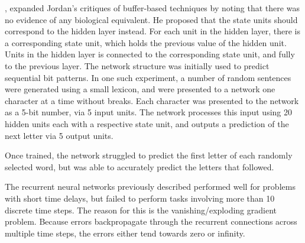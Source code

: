 


\cite{Elman:1990:Finding}, expanded Jordan's critiques of buffer-based
techniques by noting that there was no evidence of any biological equivalent.
He proposed that the state units should correspond to the hidden layer instead.
For each unit in the hidden layer, there is a corresponding state unit, which
holds the previous value of the hidden unit.
Units in the hidden layer is connected to the corresponding state unit, and
fully to the previous layer.
The network structure was initially used to predict sequential bit patterns.
In one such experiment, a number of random sentences were generated using a
small lexicon, and were presented to a network one character at a time without
breaks.
Each character was presented to the network as a 5-bit number, via 5 input
units.
The network processes this input using 20 hidden units each with a respective
state unit, and outputs a prediction of the next letter via 5 output units.

Once trained, the network struggled to predict the first letter of each randomly
selected word, but was able to accurately predict the letters that followed.



%    



The recurrent neural networks previously described performed well for problems
with short time delays, but failed to perform tasks involving more than 10
discrete time steps.
The reason for this is the vanishing/exploding gradient problem.
Because errors backpropagate through the recurrent connections across multiple
time steps, the errors either tend towards zero or infinity.

